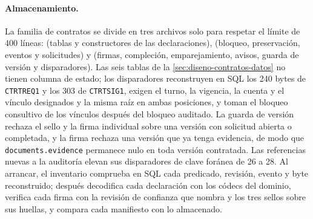 \paragraph{Almacenamiento.} La familia de contratos se divide en tres archivos
solo para respetar el límite de 400 líneas:  (tablas y
constructores de las declaraciones),  (bloqueo,
preservación, eventos y solicitudes) y 
(firmas, compleción, emparejamiento, avisos, guarda de versión y disparadores).
Las seis tablas de la \cref{sec:diseno-contratos-datos} no tienen columna de
estado; los disparadores reconstruyen en SQL los 240 bytes de
\texttt{CTRTREQ1} y los 303 de \texttt{CTRTSIG1}, exigen el turno, la vigencia,
la cuenta y el vínculo designados y la misma raíz en ambas posiciones, y
toman el bloqueo consultivo de los vínculos después del bloqueo auditado.
La guarda de versión rechaza el sello y la firma individual sobre una versión
con solicitud abierta o completada, y la firma rechaza una versión que ya tenga
evidencia, de modo que \texttt{documents.evidence} permanece nulo en toda
versión contratada. Las referencias nuevas a la auditoría elevan sus
disparadores de clave foránea de 26 a 28. Al arrancar, el inventario comprueba
en SQL cada predicado, revisión, evento y byte reconstruido; después decodifica
cada declaración con los códecs del dominio, verifica cada firma con la
revisión de confianza que nombra y los tres sellos sobre sus huellas, y
compara cada manifiesto con lo almacenado.


